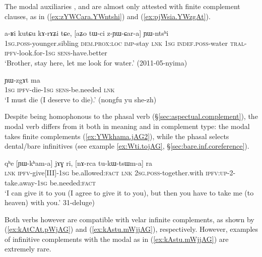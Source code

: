 The modal auxiliaries ,  and  are almost only attested with finite complement clauses, as in (\ref{ex:zYWCara.YWntshi}) and (\ref{ex:pjWsia.YWzgAt}).

\begin{exe} 
\ex \label{ex:zYWCara.YWntshi}
\gll a-ʁi kutɕu kɤ-rɤʑi tɕe, [aʑo tɯ-ci z-ɲɯ-ɕar-a] ɲɯ-ntsʰi \\
\textsc{1sg}.\textsc{poss}-younger.sibling \textsc{dem}.\textsc{prox}:\textsc{loc} \textsc{imp}-stay \textsc{lnk} \textsc{1sg} \textsc{indef}.\textsc{poss}-water \textsc{tral}-\textsc{ipfv}-look.for-\textsc{1sg} \textsc{sens}-have.better \\
\glt `Brother, stay here, let me look for water.' (2011-05-nyima)
\end{exe} 

\begin{exe} 
\ex \label{ex:pjWsia.YWzgAt}
 ɲɯ-zgɤt ma \\
\textsc{1sg} \textsc{ipfv}-die-\textsc{1sg} \textsc{sens}-be.needed \textsc{lnk} \\
\glt `I must die (I deserve to die).' (nongfu yu she-zh)
\end{exe} 


Despite being homophonous to the phasal verb  (§\ref{sec:aspectual.complement}), the modal verb   differs from it both in meaning and in complement type: the modal  takes finite complements (\ref{ex:YWkhama.jAG2}), while the phasal  selects dental/bare infinitives (see example \ref{ex:Wti.tojAG}, §\ref{sec:bare.inf.coreference}).

\begin{exe} 
\ex \label{ex:YWkhama.jAG2}
\gll qʰe [ɲɯ-kʰam-a] jɤɣ ri, [nɤ-rca tu-kɯ-tsɯm-a] ra \\
\textsc{lnk} \textsc{ipfv}-give[III]-\textsc{1sg} be.allowed:\textsc{fact} \textsc{lnk} \textsc{2sg}.\textsc{poss}-together.with \textsc{ipfv}:\textsc{up}-2\fl{}-take.away-\textsc{1sg} be.needed:\textsc{fact} \\
\glt `I can give it to you (I agree to give it to you), but then you have to take me (to heaven) with you.' 31-deluge)
\end{exe} 

Both verbs however are compatible with velar infinite complements, as shown by (\ref{ex:kAtCAt.pWjAG}) and (\ref{ex:kAstu.mWjjAG}), respectively. However, examples of infinitive complements with the modal  as in (\ref{ex:kAstu.mWjjAG}) are extremely rare.

